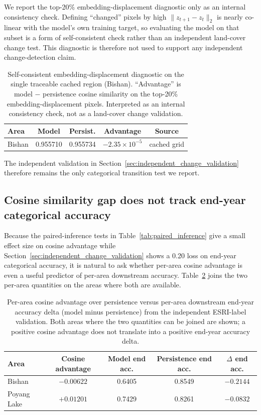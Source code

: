 \documentclass{article}
\begin{document}
We report the top-20\% embedding-displacement diagnostic only as an internal consistency check. Defining ``changed'' pixels by high $\|z_{t+1}-z_t\|_2$ is nearly co-linear with the model's own training target, so evaluating the model on that subset is a form of self-consistent check rather than an independent land-cover change test. This diagnostic is therefore not used to support any independent change-detection claim.

\begin{table}[htbp]
\centering
\caption{Self-consistent embedding-displacement diagnostic on the single traceable cached region (Bishan). ``Advantage'' is model $-$ persistence cosine similarity on the top-20\% embedding-displacement pixels. Interpreted as an internal consistency check, not as a land-cover change validation.}
\label{tab:changepixel}
\begin{tabular}{lcccc}
\toprule
Area & Model & Persist. & Advantage & Source \\
\midrule
Bishan & 0.955710 & 0.955734 & $-2.35 \times 10^{-5}$ & cached grid \\
\bottomrule
\end{tabular}
\end{table}

The independent validation in Section~\ref{sec:independent_change_validation} therefore remains the only categorical transition test we report.

\subsection{Cosine similarity gap does not track end-year categorical accuracy}
\label{sec:cosine_to_accuracy}

Because the paired-inference tests in Table~\ref{tab:paired_inference} give a small effect size on cosine advantage while Section~\ref{sec:independent_change_validation} shows a 0.20 loss on end-year categorical accuracy, it is natural to ask whether per-area cosine advantage is even a useful predictor of per-area downstream accuracy. Table~\ref{tab:cosine_to_accuracy} joins the two per-area quantities on the areas where both are available.

\begin{table}[htbp]
\centering
\caption{Per-area cosine advantage over persistence versus per-area downstream end-year accuracy delta (model minus persistence) from the independent ESRI-label validation. Both areas where the two quantities can be joined are shown; a positive cosine advantage does not translate into a positive end-year accuracy delta.}
\label{tab:cosine_to_accuracy}
\small
\begin{tabular*}{\textwidth}{@{\extracolsep{\fill}}lcccc@{}}
\toprule
Area & Cosine advantage & Model end acc. & Persistence end acc. & $\Delta$ end acc. \\
\midrule
Bishan       & $-0.00622$ & 0.6405 & 0.8549 & $-0.2144$ \\
Poyang Lake  & $+0.01201$ & 0.7429 & 0.8261 & $-0.0832$ \\
\bottomrule
\end{tabular*}
\end{table}
\end{document}

